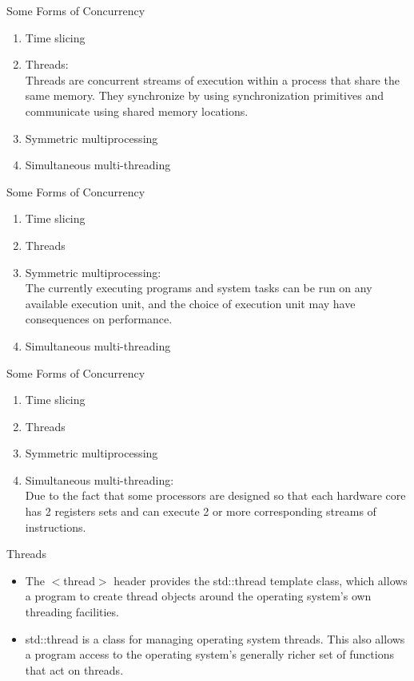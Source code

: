 \documentclass[aspectratio=169,xcolor=dvipsnames]{beamer}
\begin{document}
\begin{frame}{Some Forms of Concurrency}
    \begin{enumerate}
        \item Time slicing
        \item Threads:\\
        Threads are concurrent streams of execution within a process that share the same memory. They synchronize by using synchronization primitives and communicate using shared memory locations.
        \item Symmetric multiprocessing
        \item Simultaneous multi-threading
    \end{enumerate}
\end{frame}

\begin{frame}{Some Forms of Concurrency}
    \begin{enumerate}
        \item Time slicing
        \item Threads
        \item Symmetric multiprocessing:\\
        The currently executing programs and system tasks can be run on any available execution unit, and the choice of execution unit may have consequences on performance.
        \item Simultaneous multi-threading
    \end{enumerate}
\end{frame}

\begin{frame}{Some Forms of Concurrency}
    \begin{enumerate}
        \item Time slicing
        \item Threads
        \item Symmetric multiprocessing
        \item Simultaneous multi-threading:\\
        Due to the fact that some processors are designed so that each hardware core has 2 registers sets and can execute 2 or more corresponding streams of instructions.
    \end{enumerate}
\end{frame}

\begin{frame}{Threads}
    \begin{itemize}
        \item The $<$thread$>$ header provides the std::thread template class, which allows a program to create thread objects around the operating system's own threading facilities.
        \item std::thread is a class for managing operating system threads. This also allows a program access to the operating system’s generally richer set of functions that act on threads.
    \end{itemize}
\end{frame}
\end{document}
